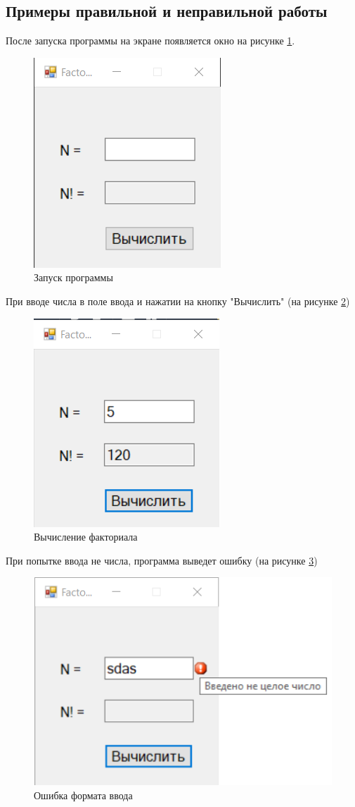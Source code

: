 \subsection{Примеры правильной и неправильной работы}
После запуска программы на экране появляется окно на рисунке \ref{task1_launch1}.
\begin{figure}[H]
    \centering
    \includegraphics[width=0.4\linewidth]{lections/img/task1_launch1.png}
    \caption{Запуск программы}
    \label{task1_launch1}
\end{figure}
При вводе числа в поле ввода и нажатии на кнопку "Вычислить" (на рисунке \ref{task1_launch2})
\begin{figure}[H]
    \centering
    \includegraphics[width=0.4\linewidth]{lections/img/task1_launch2.png}
    \caption{Вычисление факториала}
    \label{task1_launch2}
\end{figure}
При попытке ввода не числа, программа выведет ошибку (на рисунке \ref{task1_launch3})
\begin{figure}[H]
    \centering
    \includegraphics[width=0.4\linewidth]{lections/img/task1_launch3.png}
    \caption{Ошибка формата ввода}
    \label{task1_launch3}
\end{figure}

